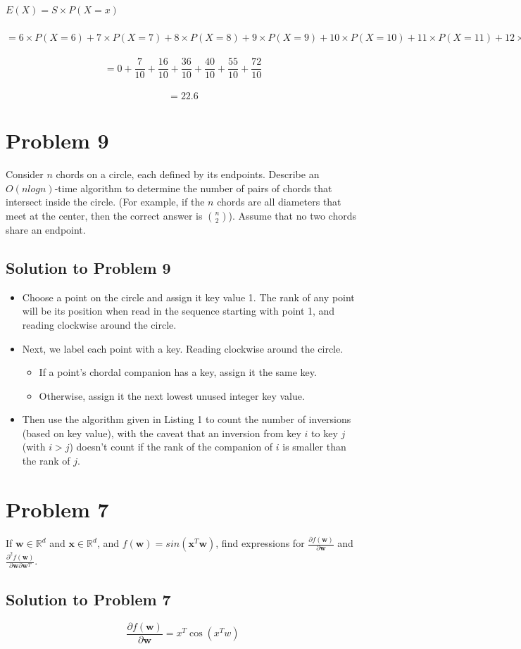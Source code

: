 \documentclass{article}
\begin{document}
$ E(X) = S \times P(X = x) $ \\ \\
$ = 6 \times P(X=6) + 7 \times P(X=7) + 8 \times P(X=8) + 9 \times P(X=9) + 10 \times P(X=10) + 11 \times P(X=11) + 12 \times P(X=12)$ \\ \\
$$= 0 + \frac{7}{10} + \frac{16}{10} + \frac{36}{10} + \frac{40}{10} + \frac{55}{10} + \frac{72}{10}$$ \\
$$=22.6$$

\section{Problem 9}
Consider $n$ chords on a circle, each defined by its endpoints. Describe an $O(nlogn)$-time algorithm to determine the number of pairs of chords that intersect inside the circle. (For example, if the $n$ chords are all diameters that meet at the center, then the correct answer is $\binom n2$). Assume that no two chords share an endpoint.

\subsection{Solution to Problem 9}

\begin{itemize}
	\item Choose a point on the circle and assign it key value 1. The rank of any point will be its position when read in the sequence starting with point 1, and reading clockwise around the circle.
	\item  Next, we label each point with a key. Reading clockwise around the circle.
	\begin{itemize}
		\item If a point’s chordal companion has a key, assign it
		the same key.
		\item Otherwise, assign it the next lowest unused integer key value. 
	\end{itemize} 
	\item Then use the algorithm given in Listing 1 to count the
	number of inversions (based on key value), with the caveat that an inversion from key $i$ to key $j$ (with $i > j$) doesn’t count if the rank of the companion of $i$ is smaller than the rank of $j$.
\end{itemize}

\section{Problem 7}
If $\boldsymbol{w} \in \mathbb{R}^{d}$ and $\boldsymbol{x} \in \mathbb{R}^{d}$, and $f(\boldsymbol{w}) = sin(\boldsymbol{x}^{T}\boldsymbol{w})$, find expressions for $\frac{\partial f(\boldsymbol{w})}{\partial \boldsymbol{w}}$ and $\frac{\partial^{2} f(\boldsymbol{w})}{\partial \boldsymbol{w} \partial \boldsymbol{w}^{T}}$.

\subsection{Solution to Problem 7}
$$\frac{\partial f(\boldsymbol{w})}{\partial \boldsymbol{w}} = x^{T}\cos(x^{T}w)$$
\end{document}
